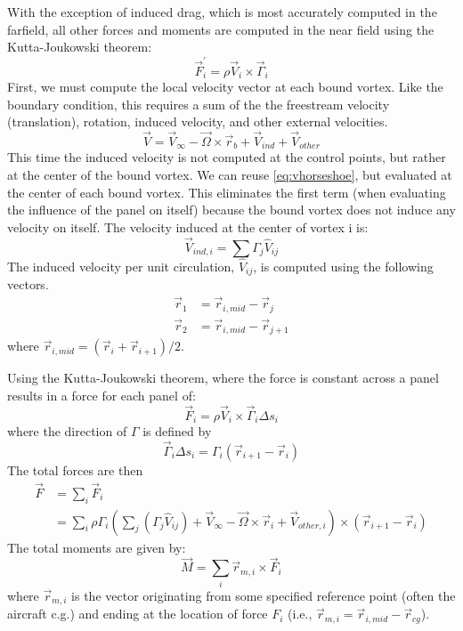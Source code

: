 \documentclass{article}
\begin{document}
With the exception of induced drag, which is most accurately computed in the farfield, all other forces and moments are computed in the near field using the Kutta-Joukowski theorem:
\begin{equation}
\vec F^\prime_i = \rho \vec V_i \times \vec \Gamma_i
\end{equation}
First, we must compute the local velocity vector at each bound vortex.  Like the boundary condition, this requires a sum of the the freestream velocity (translation), rotation, induced velocity, and other external velocities.  
\begin{equation}
\vec V = \vec{V}_\infty - \vec{\Omega} \times \vec{r}_b + \vec{V}_{ind} + \vec{V}_{other}
\end{equation}
This time the induced velocity is not computed at the control points, but rather at the center of the bound vortex.  We can reuse \cref{eq:vhorseshoe}, but evaluated at the center of each bound vortex.  This eliminates the first term (when evaluating the influence of the panel on itself) because the bound vortex does not induce any velocity on itself.  The velocity induced at the center of vortex i is:
\begin{equation}
\vec{V}_{ind, i} = \sum \Gamma_j \hat{V}_{ij}
\end{equation}
The induced velocity per unit circulation, $\hat{V}_{ij}$, is computed using the following vectors.
\begin{align}
\vec{r}_1 &= {\vec r}_{i,mid} - \vec{r}_{j}\\
\vec{r}_2 &= {\vec r}_{i,mid} - \vec{r}_{j+1}
\end{align}
where ${\vec r}_{i,mid} = (\vec{r}_i + \vec{r}_{i+1})/2$.  


Using the Kutta-Joukowski theorem, where the force is constant across a panel results in a force for each panel of:
\begin{equation}
\vec F_i = \rho \vec V_i \times \vec \Gamma_i \Delta s_i
\end{equation}
where the direction of $\Gamma$ is defined by
\begin{equation}
\vec \Gamma_i \Delta s_i = \Gamma_i (\vec{r}_{i+1} - \vec{r}_{i})
\end{equation}
The total forces are then
\begin{align}
\vec{F} &= \sum_i \vec{F}_i\\
&= \sum_i \rho \Gamma_i \left(\sum_j (\Gamma_j \hat{V}_{ij} ) + \vec{V}_\infty - \vec{\Omega} \times \vec{r}_i + \vec{V}_{other, i}\right)\times  (\vec{r}_{i+1} - \vec{r}_{i})
\label{eq:forces}
\end{align}
The total moments are given by:
\begin{equation}
\vec M = \sum_i \vec r_{m, i} \times \vec{F}_i
\end{equation}
where $\vec r_{m, i}$ is the vector originating from some specified reference point (often the aircraft c.g.) and ending at the location of force $F_i$ (i.e., $\vec r_{m, i} = \vec r_{i, mid} - \vec r_{cg}$).
\end{document}

